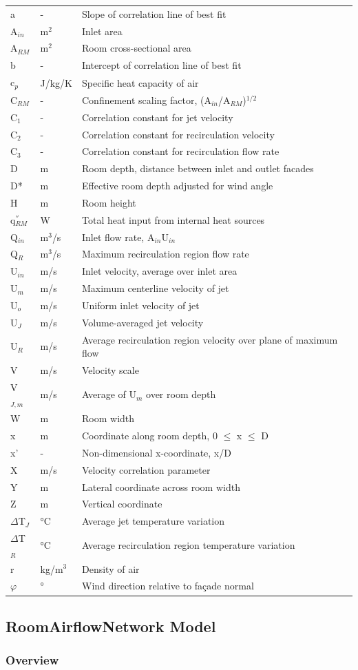 \begin{longtable}[c]{p{1.0in}p{1.0in}p{3.5in}}
a & - & Slope of correlation line of best fit \tabularnewline
A\(_{in}\) & m\(^2\) & Inlet area \tabularnewline
A\(_{RM}\) & m\(^2\) & Room cross-sectional area \tabularnewline
b & - & Intercept of correlation line of best fit \tabularnewline
c\(_{p}\) & J/kg/K & Specific heat capacity of air \tabularnewline
C\(_{RM}\) & - & Confinement scaling factor, (A\(_{in}\)/A\(_{RM}\))\(^{1/2}\) \tabularnewline
C\(_{1}\) & - & Correlation constant for jet velocity \tabularnewline
C\(_{2}\) & - & Correlation constant for recirculation velocity \tabularnewline
C\(_{3}\) & - & Correlation constant for recirculation flow rate \tabularnewline
D & m & Room depth, distance between inlet and outlet facades \tabularnewline
D* & m & Effective room depth adjusted for wind angle \tabularnewline
H & m & Room height \tabularnewline
q\(^{''}_{RM}\) & W & Total heat input from internal heat sources \tabularnewline
Q\(_{in}\) & m\(^3\)/s & Inlet flow rate, A\(_{in}\)U\(_{in}\) \tabularnewline
Q\(_R\) & m\(^3\)/s & Maximum recirculation region flow rate \tabularnewline
U\(_{in}\) & m/s & Inlet velocity, average over inlet area \tabularnewline
U\(_{m}\) & m/s & Maximum centerline velocity of jet \tabularnewline
U\(_{o}\) & m/s & Uniform inlet velocity of jet \tabularnewline
U\(_{J}\) & m/s & Volume-averaged jet velocity \tabularnewline
U\(_{R}\) & m/s & Average recirculation region velocity over plane of maximum flow \tabularnewline
V & m/s & Velocity scale \tabularnewline
V\(_{J,m}\) & m/s & Average of U\(_{m}\) over room depth \tabularnewline
W & m & Room width \tabularnewline
x & m & Coordinate along room depth, 0 $\leq$ x $\leq$ D \tabularnewline
x' & - & Non-dimensional x-coordinate, x/D \tabularnewline
X & m/s & Velocity correlation parameter \tabularnewline
Y & m & Lateral coordinate across room width \tabularnewline
Z & m & Vertical coordinate \tabularnewline
$\Delta$T\(_{J}\) & °C & Average jet temperature variation \tabularnewline
$\Delta$T\(_{R}\) & °C & Average recirculation region temperature variation \tabularnewline
r & kg/m\(^3\) & Density of air \tabularnewline
$\varphi$ & ° & Wind direction relative to façade normal \tabularnewline
\bottomrule
\end{longtable}

\subsection{RoomAirflowNetwork Model}\label{roomairflownetwork-model}

\subsubsection{Overview}\label{overview-4-001}

